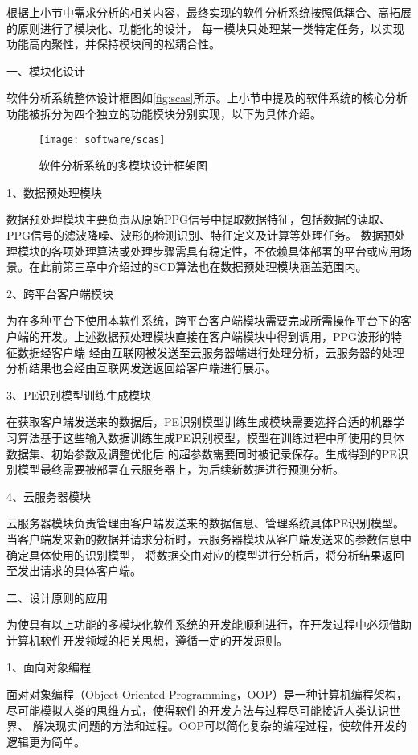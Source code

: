 根据上小节中需求分析的相关内容，最终实现的软件分析系统按照低耦合、高拓展的原则进行了模块化、功能化的设计，
每一模块只处理某一类特定任务，以实现功能高内聚性，并保持模块间的松耦合性。

一、模块化设计

软件分析系统整体设计框图如\autoref{fig:scas}所示。上小节中提及的软件系统的核心分析功能被拆分为四个独立的功能模块分别实现，以下为具体介绍。
\begin{figure}[htbp]
    \centering
    \texttt{[image: software/scas]}
    \caption{\label{fig:scas}软件分析系统的多模块设计框架图}
\end{figure}

1、数据预处理模块

数据预处理模块主要负责从原始PPG信号中提取数据特征，包括数据的读取、PPG信号的滤波降噪、波形的检测识别、特征定义及计算等处理任务。
数据预处理模块的各项处理算法或处理步骤需具有稳定性，不依赖具体部署的平台或应用场景。在此前第三章中介绍过的SCD算法也在数据预处理模块涵盖范围内。

2、跨平台客户端模块

为在多种平台下使用本软件系统，跨平台客户端模块需要完成所需操作平台下的客户端的开发。上述数据预处理模块直接在客户端模块中得到调用，PPG波形的特征数据经客户端
经由互联网被发送至云服务器端进行处理分析，云服务器的处理分析结果也会经由互联网发送返回给客户端进行展示。

3、PE识别模型训练生成模块

在获取客户端发送来的数据后，PE识别模型训练生成模块需要选择合适的机器学习算法基于这些输入数据训练生成PE识别模型，模型在训练过程中所使用的具体数据集、初始参数及调整优化后
的超参数需要同时被记录保存。生成得到的PE识别模型最终需要被部署在云服务器上，为后续新数据进行预测分析。

4、云服务器模块

云服务器模块负责管理由客户端发送来的数据信息、管理系统具体PE识别模型。当客户端发来新的数据并请求分析时，云服务器模块从客户端发送来的参数信息中确定具体使用的识别模型，
将数据交由对应的模型进行分析后，将分析结果返回至发出请求的具体客户端。

二、设计原则的应用

为使具有以上功能的多模块化软件系统的开发能顺利进行，在开发过程中必须借助计算机软件开发领域的相关思想，遵循一定的开发原则。

1、面向对象编程

面对对象编程（Object Oriented Programming，OOP）是一种计算机编程架构，尽可能模拟人类的思维方式，使得软件的开发方法与过程尽可能接近人类认识世界、
解决现实问题的方法和过程。OOP可以简化复杂的编程过程，使软件开发的逻辑更为简单。

